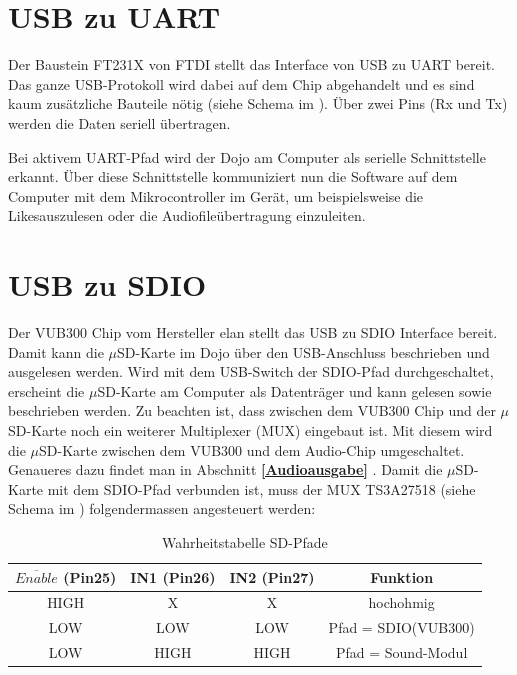 \section{USB zu UART}

Der Baustein FT231X von FTDI stellt das Interface von USB zu UART bereit. Das ganze USB-Protokoll wird dabei auf dem Chip abgehandelt und es sind kaum zusätzliche Bauteile nötig (siehe Schema im ). Über zwei Pins (Rx und Tx) werden die Daten seriell übertragen.

Bei aktivem UART-Pfad wird der Dojo am Computer als serielle Schnittstelle erkannt. Über diese Schnittstelle kommuniziert nun die Software auf dem Computer mit dem Mikrocontroller im Gerät, um beispielsweise die \flq Likes\frq  auszulesen oder die Audiofileübertragung einzuleiten.


\section{USB zu SDIO}

Der VUB300 Chip vom Hersteller elan stellt das USB zu SDIO Interface bereit. Damit kann die $\mu$SD-Karte im Dojo über den USB-Anschluss beschrieben und ausgelesen werden. Wird mit dem USB-Switch der SDIO-Pfad durchgeschaltet, erscheint die $\mu$SD-Karte am Computer als Datenträger und kann gelesen sowie beschrieben werden. Zu beachten ist, dass zwischen dem VUB300 Chip und der $\mu$SD-Karte noch ein weiterer Multiplexer (MUX) eingebaut ist. Mit diesem wird die $\mu$SD-Karte zwischen dem VUB300 und dem Audio-Chip umgeschaltet. Genaueres dazu findet man in Abschnitt \textbf{\ref{Audioausgabe} }.
Damit die $\mu$SD-Karte mit dem SDIO-Pfad verbunden ist, muss der MUX TS3A27518 (siehe Schema im ) folgendermassen angesteuert werden:

\begin{table}[h]
	\centering
	\begin{tabular}{|c|c|c|c|} 
		$\overline{Enable}$ (Pin25) & IN1 (Pin26) & IN2 (Pin27) & Funktion \\ 
		\hline 
		HIGH & X & X & hochohmig \\ 
		\hline 
		LOW & LOW & LOW & Pfad = SDIO(VUB300) \\ 
		\hline 
		LOW & HIGH & HIGH & Pfad = Sound-Modul \\ 
	\end{tabular} 
	\caption{Wahrheitstabelle SD-Pfade}
	\label{truth_table_sd}
\end{table}

